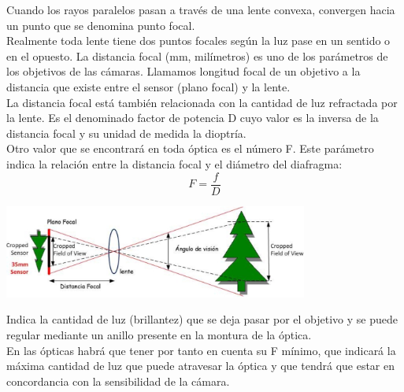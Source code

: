 Cuando los rayos paralelos pasan a través de una lente convexa, convergen
hacia un punto que se denomina punto focal.\\
Realmente toda lente tiene dos puntos focales según la luz pase en un sentido o
en el opuesto. La distancia focal (mm, milímetros) es uno de los parámetros de los
objetivos de las cámaras. Llamamos longitud  focal de un objetivo a la distancia que
existe entre el sensor (plano focal) y la lente.\\
La distancia focal está también relacionada con la cantidad de luz
refractada por la lente. Es el denominado factor de potencia D cuyo valor es la inversa
de la distancia focal y su unidad de medida la dioptría.\\
Otro valor que se encontrará en toda óptica es el número F. Este parámetro
indica la relación entre la distancia focal y el diámetro del diafragma:
\begin{equation}
    F = \frac{f}{D}
\end{equation}
\begin{center}
    \includegraphics[width=0.75\textwidth]{Capitulo2/Fig1_4.eps}
    \label{Fig1_4}
\end{center}
Indica la cantidad de luz (brillantez) que se deja pasar por el objetivo y se puede regular
mediante un anillo presente en la montura de la óptica.\\
En las ópticas habrá que tener por
tanto en cuenta su F mínimo, que indicará la máxima cantidad de luz que puede
atravesar la óptica y que tendrá que estar en concordancia con la sensibilidad de la
cámara.

